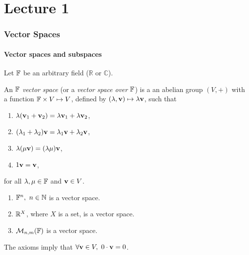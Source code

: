 \documentclass[a4paper]{article}
\begin{document}
\maketitle
\tableofcontents
\newpage
\part*{Lecture 1}
\section{Vector Spaces}
\subsection{Vector spaces and subspaces}
Let $ {\mathbb{F}} $ be an arbitrary field ($ \mathbb{R}  $ or $ \mathbb{C}  $).

\begin{definition}
    An \textit{$ {\mathbb{F}}$ vector space} (or a \textit{vector space over ${\mathbb{F}}$}) is a an abelian group $ (V,+) $ with a function $ {\mathbb{F}}\times V \mapsto V $, defined by $ (\lambda, {\bf v}) \mapsto \lambda{\bf v} $, such that 
    \begin{enumerate}
        \item $ \lambda({\bf v}_1+{\bf v}_2)=\lambda{\bf v}_1+\lambda{\bf v}_2 $,
        \item $ (\lambda_1+\lambda_2){\bf v} = \lambda_1{\bf v}+\lambda_2{\bf v} $,
        \item $ \lambda(\mu{\bf v})=(\lambda\mu){\bf v} $,
        \item $ 1{\bf v}={\bf v} $,
    \end{enumerate}
    for all $ \lambda,\mu\in {\mathbb{F}}$ and $ {\bf v}\in V $.
\end{definition}

\begin{example}
    \begin{enumerate}
        \item $ {\mathbb{F}}^n,\ n\in \mathbb{N}  $ is a vector space.
        \item $ {\mathbb{R}}^X $, where $X$ is a set, is a vector space.
        \item $ {\mathcal{M}}_{n,m}({\mathbb{F}}) $ is a vector space.
    \end{enumerate}
\end{example}
\begin{remark}
    The axioms imply that $ \forall \bfv\in V,\ 0\cdot\bfv=0 $.
\end{remark}
\end{document}

